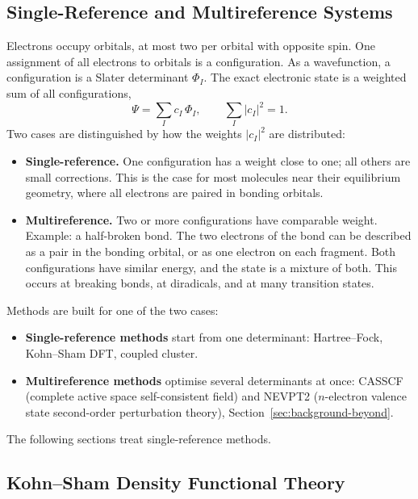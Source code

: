 \subsection{Single-Reference and Multireference Systems}
\label{sec:sr-vs-mr}

Electrons occupy orbitals, at most two per orbital with opposite spin. One
assignment of all electrons to orbitals is a configuration. As a
wavefunction, a configuration is a Slater determinant $\Phi_I$. The exact
electronic state is a weighted sum of all configurations,
%
\begin{equation}
  \Psi = \sum_I c_I \, \Phi_I , \qquad \sum_I |c_I|^2 = 1 .
  \label{eq:ci-expansion}
\end{equation}
%
Two cases are distinguished by how the weights $|c_I|^2$ are distributed:

\begin{itemize}
  \item \textbf{Single-reference.} One configuration has a weight close to
    one; all others are small corrections. This is the case for most
    molecules near their equilibrium geometry, where all electrons are paired
    in bonding orbitals.
  \item \textbf{Multireference.} Two or more configurations have comparable
    weight. Example: a half-broken bond. The two electrons of the bond can
    be described as a pair in the bonding orbital, or as one electron on
    each fragment. Both configurations have similar energy, and the state is
    a mixture of both. This occurs at breaking bonds, at diradicals, and at
    many transition states.
\end{itemize}

Methods are built for one of the two cases:

\begin{itemize}
  \item \textbf{Single-reference methods} start from one determinant:
    Hartree--Fock, Kohn--Sham DFT, coupled cluster.
  \item \textbf{Multireference methods} optimise several determinants at
    once: CASSCF (complete active space self-consistent field) and
    NEVPT2 ($n$-electron valence state second-order perturbation theory),
    Section~\ref{sec:background-beyond}.
\end{itemize}

The following sections treat single-reference methods.


\subsection{Kohn--Sham Density Functional Theory}
\label{sec:background-dft}

